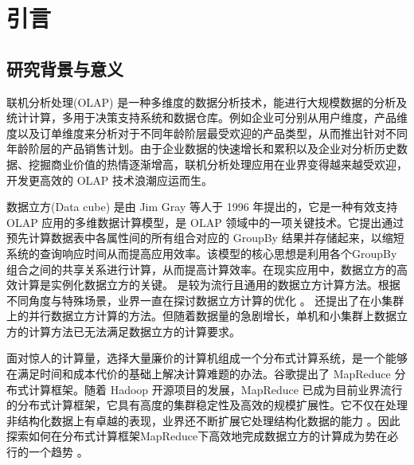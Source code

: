 \chapter{引言}

\section{研究背景与意义}
联机分析处理(OLAP) \cite{chaudhuri1997overview} 是一种多维度的数据分析技术，能进行大规模数据的分析及统计计算，多用于决策支持系统和数据仓库。例如企业可分别从用户维度，产品维度以及订单维度来分析对于不同年龄阶层最受欢迎的产品类型，从而推出针对不同年龄阶层的产品销售计划。由于企业数据的快速增长和累积以及企业对分析历史数据、挖掘商业价值的热情逐渐增高，联机分析处理应用在业界变得越来越受欢迎，开发更高效的 OLAP 技术浪潮应运而生。

数据立方(Data cube) \cite{gray1997data}是由 Jim Gray 等人于 1996 年提出的，它是一种有效支持 OLAP 应用的多维数据计算模型，是 OLAP 领域中的一项关键技术。它提出通过预先计算数据表中各属性间的所有组合对应的 GroupBy 结果并存储起来，以缩短系统的查询响应时间从而提高应用效率。该模型的核心思想是利用各个GroupBy组合之间的共享关系进行计算，从而提高计算效率。在现实应用中，数据立方的高效计算是实例化数据立方的关键。 \cite{agarwal1996computation} \cite{beyer1999bottom} 是较为流行且通用的数据立方计算方法。根据不同角度与特殊场景，业界一直在探讨数据立方计算的优化 \cite{xin2003star} \cite{harinarayan1996implementing} \cite{zhao1997array} \cite{han2001efficient} \cite{wang2002condensed}。\cite{ng2001iceberg} \cite{dehne2002parallelizing} 还提出了在小集群上的并行数据立方计算的方法。但随着数据量的急剧增长，单机和小集群上数据立方的计算方法已无法满足数据立方的计算要求。


面对惊人的计算量，选择大量廉价的计算机组成一个分布式计算系统，是一个能够在满足时间和成本代价的基础上解决计算难题的办法。谷歌提出了 MapReduce \cite{dean2008mapreduce}分布式计算框架。随着 Hadoop \cite{hadoop}开源项目的发展，MapReduce 已成为目前业界流行的分布式计算框架，它具有高度的集群稳定性及高效的规模扩展性。它不仅在处理非结构化数据上有卓越的表现，业界还不断扩展它处理结构化数据的能力 \cite{hbase} \cite{abouzeid2009hadoopdb} \cite{buck2011scihadoop} \cite{pig} \cite{hive}。因此探索如何在分布式计算框架MapReduce下高效地完成数据立方的计算成为势在必行的一个趋势
 \cite{abello2011building} \cite{wang2010mapreducemerge} \cite{sergey2009applying} \cite{lee2012efficient} \cite{wang2013scalable}。




